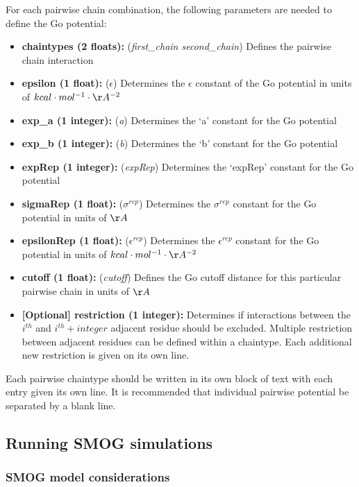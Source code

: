 For each pairwise chain combination, the following parameters are needed to define the Go potential:
\begin{itemize}
\item{\textbf{chaintypes (2 floats):}}
 (\textit{first\_chain second\_chain}) Defines the pairwise chain interaction
\item{\textbf{epsilon (1 float):}}
 (\textit{$\epsilon$}) Determines the $\epsilon$ constant of the Go potential in units of $kcal \cdot mol^{-1} \cdot \AA^{-2}$ 
\item{\textbf{exp\_a (1 integer):}}
 (\textit{a}) Determines the `a' constant for the Go potential 
\item{\textbf{exp\_b (1 integer):}}
 (\textit{b}) Determines the `b' constant for the Go potential 
\item{\textbf{expRep (1 integer):}}
 (\textit{expRep}) Determines the `expRep' constant for the Go potential 
\item{\textbf{sigmaRep (1 float):}}
 (\textit{$\sigma^{rep}$}) Determines the $\sigma^{rep}$ constant for the Go potential in units of $\AA$ 
\item{\textbf{epsilonRep (1 float):}}
 (\textit{$\epsilon^{rep}$}) Determines the $\epsilon^{rep}$ constant for the Go potential in units of $kcal \cdot mol^{-1} \cdot \AA^{-2}$ 
\item{\textbf{cutoff (1 float):}}
 (\textit{cutoff}) Defines the Go cutoff distance for this particular pairwise chain in units of $\AA$
\item{\textbf{[Optional] restriction (1 integer):}}
 Determines if interactions between the $i^{th}$ and $i^{th} + \textit{integer}$
 adjacent residue should be excluded.  Multiple restriction between adjacent residues can be defined within a chaintype.
Each additional new restriction is given on its own line.
\end{itemize}

Each pairwise chaintype should be written in its own block of text with each entry given its own line.  
It is recommended that individual pairwise potential be separated by a blank line.


\subsection{Running SMOG simulations}
\label{section:SMOG simulation}

\subsubsection{SMOG model considerations}

